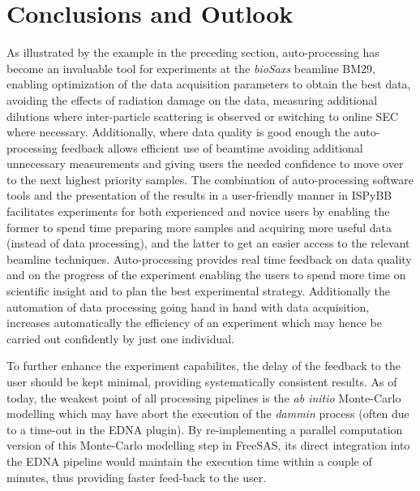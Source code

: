 \documentclass[preprint,pdf]{iucr}              %
\begin{document}
\section{Conclusions and Outlook}
As illustrated by the example in the preceding section, auto-processing has
become an invaluable tool for experiments at the \textit{bioSaxs} beamline BM29, 
enabling optimization of the
data acquisition parameters to obtain the best data, avoiding the effects of
radiation damage on the data, measuring additional dilutions where inter-particle 
scattering is observed or switching to online SEC where necessary. 
Additionally, where data quality is good enough the auto-processing feedback
allows efficient use of beamtime avoiding additional unnecessary measurements
and giving users the needed confidence to move over to the next highest priority
samples.
The combination of auto-processing software tools and
the presentation of the results in a user-friendly manner in ISPyBB facilitates
experiments for both experienced and novice users by enabling the former to
spend time preparing more samples and acquiring more useful data (instead of
data processing), and the latter to get an easier access to the relevant
beamline techniques.
Auto-processing provides real time feedback on data quality and on the progress 
of the experiment enabling the users to spend more time on scientific insight
and to plan the best experimental strategy.
Additionally the automation of data processing going hand in hand with
data acquisition, increases automatically the efficiency of an experiment
which may hence be carried out confidently by just one individual.

To further enhance the experiment capabilites, the delay of the feedback to the
user should be kept minimal, providing systematically consistent results.
As of today, the weakest point of all processing pipelines is the
\textit{ab initio} Monte-Carlo modelling which may have abort the
execution of the \textit{dammin} process (often due to a time-out in
the EDNA plugin).
By re-implementing a parallel computation version of this Monte-Carlo modelling
step in FreeSAS, its direct integration into the
EDNA pipeline would maintain the execution time within a couple of minutes,
thus providing faster feed-back to the user.

\end{document}
